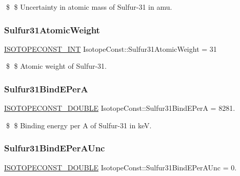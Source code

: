 \$ \$ Uncertainty in atomic mass of Sulfur-\/31 in amu. \mbox{\label{group___isotope_const-_sulfur-_s31_ga4233eee92ca51082de80652bed9cea7c}} 
\subsubsection{\texorpdfstring{Sulfur31\+Atomic\+Weight}{Sulfur31AtomicWeight}}
{\footnotesize\ttfamily \mbox{\hyperlink{group___isotope_const-_macros_ga5f18360b3e99483a35c32d789e62621c}{I\+S\+O\+T\+O\+P\+E\+C\+O\+N\+S\+T\+\_\+\+I\+NT}} Isotope\+Const\+::\+Sulfur31\+Atomic\+Weight = 31}

\$ \$ Atomic weight of Sulfur-\/31. \mbox{\label{group___isotope_const-_sulfur-_s31_gad4d2e30c415daebfd0806bcb099cb6e7}} 
\subsubsection{\texorpdfstring{Sulfur31\+Bind\+E\+PerA}{Sulfur31BindEPerA}}
{\footnotesize\ttfamily \mbox{\hyperlink{group___isotope_const-_macros_ga8f45a7272ce02c0b4c65c44636ed719a}{I\+S\+O\+T\+O\+P\+E\+C\+O\+N\+S\+T\+\_\+\+D\+O\+U\+B\+LE}} Isotope\+Const\+::\+Sulfur31\+Bind\+E\+PerA = 8281.}

\$ \$ Binding energy per A of Sulfur-\/31 in keV. \mbox{\label{group___isotope_const-_sulfur-_s31_ga2f8b8c5beb6335937932cc3ac5494a1c}} 
\subsubsection{\texorpdfstring{Sulfur31\+Bind\+E\+Per\+A\+Unc}{Sulfur31BindEPerAUnc}}
{\footnotesize\ttfamily \mbox{\hyperlink{group___isotope_const-_macros_ga8f45a7272ce02c0b4c65c44636ed719a}{I\+S\+O\+T\+O\+P\+E\+C\+O\+N\+S\+T\+\_\+\+D\+O\+U\+B\+LE}} Isotope\+Const\+::\+Sulfur31\+Bind\+E\+Per\+A\+Unc = 0.}

